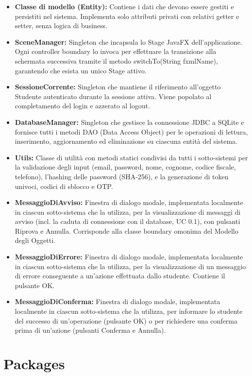 \documentclass[12pt,a4paper]{article}
\begin{document}
\begin{itemize}
  \item \textbf{Classe di modello (Entity):} Contiene i dati che devono essere gestiti e persistiti nel sistema. Implementa solo attributi privati con relativi getter e setter, senza logica di business.
  \item \textbf{SceneManager:} Singleton che incapsula lo Stage JavaFX dell'applicazione. Ogni controller boundary lo invoca per effettuare la transizione alla schermata successiva tramite il metodo switchTo(String fxmlName), garantendo che esista un unico Stage attivo.
  \item \textbf{SessioneCorrente:} Singleton che mantiene il riferimento all'oggetto Studente autenticato durante la sessione attiva. Viene popolato al completamento del login e azzerato al logout.
  \item \textbf{DatabaseManager:} Singleton che gestisce la connessione JDBC a SQLite e fornisce tutti i metodi DAO (Data Access Object) per le operazioni di lettura, inserimento, aggiornamento ed eliminazione su ciascuna entità del sistema.
  \item \textbf{Utils:} Classe di utilità con metodi statici condivisi da tutti i sotto-sistemi per la validazione degli input (email, password, nome, cognome, codice fiscale, telefono), l'hashing delle password (SHA-256), e la generazione di token univoci, codici di sblocco e OTP.
  \item \textbf{MessaggioDiAvviso:} Finestra di dialogo modale, implementata localmente in ciascun sotto-sistema che la utilizza, per la visualizzazione di messaggi di avviso (incl. la caduta di connessione con il database, UC 0.1), con pulsanti Riprova e Annulla. Corrisponde alla classe boundary omonima del Modello degli Oggetti.
  \item \textbf{MessaggioDiErrore:} Finestra di dialogo modale, implementata localmente in ciascun sotto-sistema che la utilizza, per la visualizzazione di un messaggio di errore conseguente a un'azione effettuata dallo studente. Contiene il pulsante OK.
  \item \textbf{MessaggioDiConferma:} Finestra di dialogo modale, implementata localmente in ciascun sotto-sistema che la utilizza, per informare lo studente del successo di un'operazione (pulsante OK) o per richiedere una conferma prima di un'azione (pulsanti Conferma e Annulla).
\end{itemize}

\section{Packages}
\end{document}
